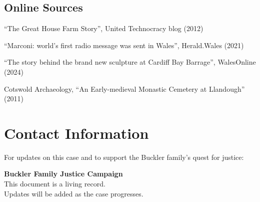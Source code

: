 \documentclass[11pt,a4paper]{article}
\begin{document}
\subsection{Online Sources}

\begin{enumerate}[label={[\arabic*]}]
    \item ``The Great House Farm Story'', United Technocracy blog (2012)
    \item ``Marconi: world's first radio message was sent in Wales'', Herald.Wales (2021)
    \item ``The story behind the brand new sculpture at Cardiff Bay Barrage'', WalesOnline (2024)
    \item Cotswold Archaeology, ``An Early-medieval Monastic Cemetery at Llandough'' (2011)
\end{enumerate}

\section{Contact Information}

For updates on this case and to support the Buckler family's quest for justice:

\begin{center}
\begin{tcolorbox}[colback=lightgray,colframe=darkblue,width=0.8\textwidth]
\centering
\textbf{Buckler Family Justice Campaign}\\[0.3cm]
This document is a living record.\\
Updates will be added as the case progresses.
\end{tcolorbox}
\end{center}
\end{document}
